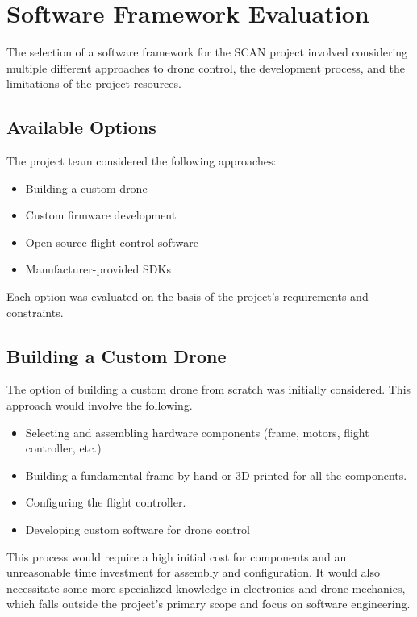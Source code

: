 \section{Software Framework Evaluation}
The selection of a software framework for the SCAN project involved considering multiple different approaches to drone control, the development process, and the limitations of the project resources. 

\subsection{Available Options}
The project team considered the following approaches:

\begin{itemize}
    \item Building a custom drone
    \item Custom firmware development
    \item Open-source flight control software
    \item Manufacturer-provided SDKs
\end{itemize}

Each option was evaluated on the basis of the project's requirements and constraints.

\subsection{Building a Custom Drone}
The option of building a custom drone from scratch was initially considered. This approach would involve the following.

\begin{itemize}
    \item Selecting and assembling hardware components (frame, motors, flight controller, etc.)
    \item Building a fundamental frame by hand or 3D printed for all the components.
    \item Configuring the flight controller.
    \item Developing custom software for drone control
\end{itemize}

This process would require a high initial cost for components and an unreasonable time investment for assembly and configuration. It would also necessitate some more specialized knowledge in electronics and drone mechanics, which falls outside the project's primary scope and focus on software engineering. 

